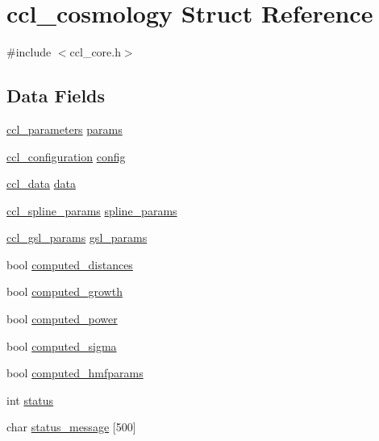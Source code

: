 \hypertarget{structccl__cosmology}{}\section{ccl\+\_\+cosmology Struct Reference}
\label{structccl__cosmology}


{\ttfamily \#include $<$ccl\+\_\+core.\+h$>$}

\subsection*{Data Fields}
\begin{DoxyCompactItemize}
\item 
\mbox{\hyperlink{structccl__parameters}{ccl\+\_\+parameters}} \mbox{\hyperlink{structccl__cosmology_ad58413720be45a206716254d9c1cc923}{params}}
\item 
\mbox{\hyperlink{structccl__configuration}{ccl\+\_\+configuration}} \mbox{\hyperlink{structccl__cosmology_a81c5ada17d334840105d2a29b76323fd}{config}}
\item 
\mbox{\hyperlink{structccl__data}{ccl\+\_\+data}} \mbox{\hyperlink{structccl__cosmology_a672d3fab40334e3a5da4324604715370}{data}}
\item 
\mbox{\hyperlink{structccl__spline__params}{ccl\+\_\+spline\+\_\+params}} \mbox{\hyperlink{structccl__cosmology_a9bd12a07ba9c3244d5171ee7fb484e06}{spline\+\_\+params}}
\item 
\mbox{\hyperlink{structccl__gsl__params}{ccl\+\_\+gsl\+\_\+params}} \mbox{\hyperlink{structccl__cosmology_aaf7a9afcf1b7d73f9d1bfe16531c47dd}{gsl\+\_\+params}}
\item 
bool \mbox{\hyperlink{structccl__cosmology_adb5cd3d53f2031a0716da22f45b4942f}{computed\+\_\+distances}}
\item 
bool \mbox{\hyperlink{structccl__cosmology_a4428497be74cf69ef0b4e8798d957e0b}{computed\+\_\+growth}}
\item 
bool \mbox{\hyperlink{structccl__cosmology_a6e67313352cef8c3ebd92dedd9913a2e}{computed\+\_\+power}}
\item 
bool \mbox{\hyperlink{structccl__cosmology_af2a13ba151996b6c144b7910c753597c}{computed\+\_\+sigma}}
\item 
bool \mbox{\hyperlink{structccl__cosmology_aad9340b8e85ae0f89ad3ac1136c590a7}{computed\+\_\+hmfparams}}
\item 
int \mbox{\hyperlink{structccl__cosmology_a6de30ecc78151cd63260547adc344e78}{status}}
\item 
char \mbox{\hyperlink{structccl__cosmology_ade6f0b525e23bd7c719a46fe0e083a5e}{status\+\_\+message}} \mbox{[}500\mbox{]}
\end{DoxyCompactItemize}



